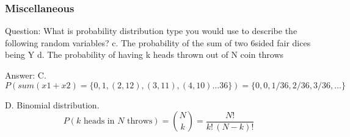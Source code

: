 \documentclass[11pt]{beamer}
\begin{document}
\begin{frame}
\frametitle{Miscellaneous}
\begin{block}{Question:}
	What is probability distribution type you would use to describe the following random variables?
	c. The probability of the sum of two 6­sided fair dices being Y
	d. The probability of having k heads thrown out of N coin throws
\end{block}
\begin{block}{Answer:}
	C. $P(sum(x1+x2) = \{0,1,(2,12),(3,11),(4,10)\ldots 36\}) = \{0,0,1/36,2/36,3/36,\ldots\}$
	
	D. Binomial distribution. 
	\[
		P(k \text{ heads in } N \text{ throws}) = \binom{N}{k} = \frac{N!}{k!\, (N-k)!}
	\]
\end{block}
\end{frame}
\end{document}
